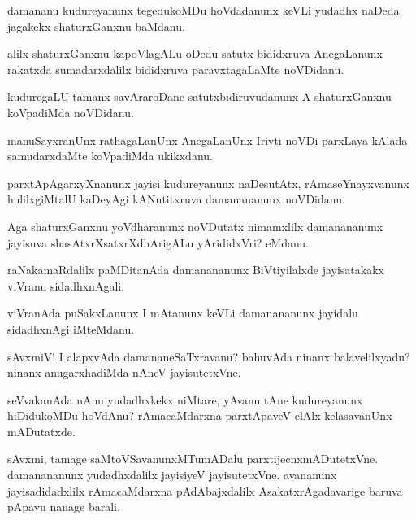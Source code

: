 \documentclass{article}
\begin{document}
\begin{mn}%
damananu kudureyanunx tegedukoMDu hoVdadanunx keVLi yudadhx naDeda jagakekx shaturxGanxnu 
baMdanu.
\end{mn}

\begin{mn}%
alilx shaturxGanxnu kapoVlagALu oDedu satutx bididxruva AnegaLanunx rakatxda 
sumadarxdalilx bididxruva paravxtagaLaMte noVDidanu.
\end{mn}

\begin{mn}%
kuduregaLU tamanx savAraroDane satutxbidiruvudanunx A shaturxGanxnu koVpadiMda noVDidanu.
\end{mn}

\begin{mn}%
manuSayxranUnx rathagaLanUnx AnegaLanUnx Irivti noVDi parxLaya kAlada samudarxdaMte 
koVpadiMda ukikxdanu.
\end{mn}

\begin{mn}%
parxtApAgarxyXnanunx jayisi kudureyanunx naDesutAtx, rAmaseYnayxvanunx hulilxgiMtalU 
kaDeyAgi kANutitxruva damanananunx noVDidanu.
\end{mn}

\begin{mn}%
Aga shaturxGanxnu yoVdharanunx noVDutatx nimamxlilx damanananunx jayisuva 
shasAtxrXsatxrXdhArigALu yArididxVri? eMdanu.
\end{mn}

\begin{mn}%
raNakamaRdalilx paMDitanAda damanananunx BiVtiyilalxde jayisatakakx viVranu sidadhxnAgali.
\end{mn}

\begin{mn}%
viVranAda puSakxLanunx I mAtanunx keVLi damanananunx jayidalu sidadhxnAgi iMteMdanu. 
\end{mn}

\begin{mn}%
sAvxmiV! I alapxvAda damananeSaTxravanu? bahuvAda ninanx balavelilxyadu? ninanx 
anugarxhadiMda nAneV jayisutetxVne.
\end{mn}

\begin{mn}%
seVvakanAda nAnu yudadhxkekx niMtare, yAvanu tAne kudureyanunx hiDidukoMDu hoVdAnu? 
rAmacaMdarxna parxtApaveV elAlx kelasavanUnx mADutatxde.
\end{mn}

\begin{mn}%
sAvxmi, tamage saMtoVSavanunxMTumADalu parxtijecnxmADutetxVne. damanananunx yudadhxdalilx 
jayisiyeV jayisutetxVne. avananunx jayisadidadxlilx rAmacaMdarxna pAdAbajxdalilx 
AsakatxrAgadavarige baruva pApavu nanage barali.
\end{mn}
\end{document}
